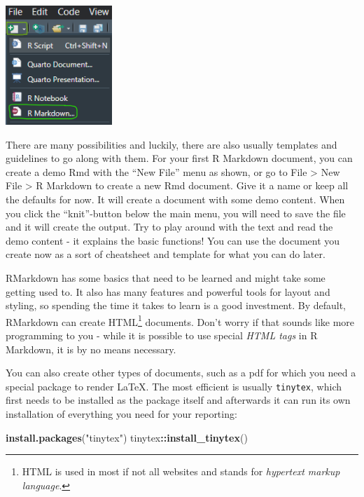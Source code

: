 \documentclass[
]{book}
\newenvironment{Shaded}{\begin{snugshade}}{\end{snugshade}}
\newcommand{\FunctionTok}[1]{\textcolor[rgb]{0.13,0.29,0.53}{\textbf{#1}}}
\newcommand{\NormalTok}[1]{#1}
\newcommand{\SpecialCharTok}[1]{\textcolor[rgb]{0.81,0.36,0.00}{\textbf{#1}}}
\newcommand{\StringTok}[1]{\textcolor[rgb]{0.31,0.60,0.02}{#1}}
\begin{document}
\includegraphics[width=\textwidth,height=1.77083in]{./img/rmd-click.png}

There are many possibilities and luckily, there are also usually templates and guidelines to go along with them.
For your first R Markdown document, you can create a demo Rmd with the ``New File'' menu as shown, or go to File \textgreater{} New File \textgreater{} R Markdown to create a new Rmd document.
Give it a name or keep all the defaults for now.
It will create a document with some demo content.
When you click the ``knit''-button below the main menu, you will need to save the file and it will create the output.
Try to play around with the text and read the demo content - it explains the basic functions!
You can use the document you create now as a sort of cheatsheet and template for what you can do later.

RMarkdown has some basics that need to be learned and might take some getting used to.
It also has many features and powerful tools for layout and styling, so spending the time it takes to learn is a good investment.
By default, RMarkdown can create HTML\footnote{HTML is used in most if not all websites and stands for \emph{hypertext markup language}.} documents.
Don't worry if that sounds like more programming to you - while it is possible to use special \emph{HTML tags} in R Markdown, it is by no means necessary.

You can also create other types of documents, such as a pdf for which you need a special package to render \LaTeX.
The most efficient is usually \texttt{tinytex}, which first needs to be installed as the package itself and afterwards it can run its own installation of everything you need for your reporting:

\begin{Shaded}
\begin{Highlighting}[]
\FunctionTok{install.packages}\NormalTok{(}\StringTok{"tinytex"}\NormalTok{)}
\NormalTok{tinytex}\SpecialCharTok{::}\FunctionTok{install\_tinytex}\NormalTok{()}
\end{Highlighting}
\end{Shaded}
\end{document}
